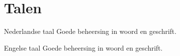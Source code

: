 \section*{Talen}

	\begin{languageList}
		\item[Nederlandse taal] Goede beheersing in woord en geschrift.
		\item[Engelse taal] Goede beheersing in woord en geschrift.
	\end{languageList}
